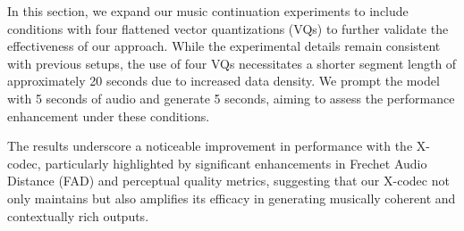 

In this section, we expand our music continuation experiments to include conditions with four flattened vector quantizations (VQs) to further validate the effectiveness of our approach. While the experimental details remain consistent with previous setups, the use of four VQs necessitates a shorter segment length of approximately 20 seconds due to increased data density. We prompt the model with 5 seconds of audio and generate  5 seconds, aiming to assess the performance enhancement under these conditions.

\begin{table}[h]
\centering
\caption{Comparison between baseline acoustic codec and our X-codec on music continuation.}
\label{music}
\end{table}
The results underscore a noticeable improvement in performance with the X-codec, particularly highlighted by significant enhancements in Frechet Audio Distance (FAD) and perceptual quality metrics, suggesting that our X-codec not only maintains but also amplifies its efficacy in generating musically coherent and contextually rich outputs.

